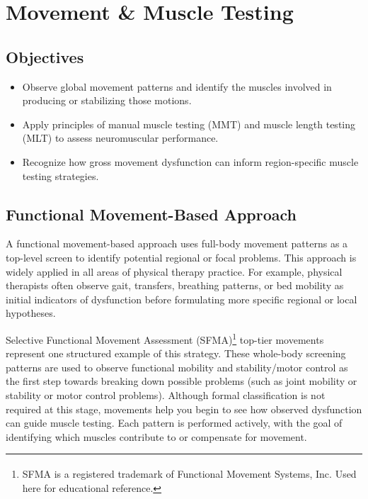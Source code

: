 \chapter{Movement \& Muscle Testing}\label{chp:muscle_testing}

\section*{Objectives}
\begin{itemize}
  \item Observe global movement patterns and identify the muscles involved in producing or stabilizing those motions.
  \item Apply principles of manual muscle testing (MMT) and muscle length testing (MLT) to assess neuromuscular performance.
  \item Recognize how gross movement dysfunction can inform region-specific muscle testing strategies.
\end{itemize}

\section*{Functional Movement-Based Approach}

A functional movement-based approach uses full-body movement patterns as a top-level screen to identify potential regional or focal problems. This approach is widely applied in all areas of physical therapy practice. For example, physical therapists often observe gait, transfers, breathing patterns, or bed mobility as initial indicators of dysfunction before formulating more specific regional or local hypotheses. 

 Selective Functional Movement Assessment (SFMA)\textsuperscript{\textregistered}\footnote{SFMA\textsuperscript{\textregistered} is a registered trademark of Functional Movement Systems, Inc. Used here for educational reference.} top-tier movements represent one structured example of this strategy. These whole-body screening patterns are used to observe functional mobility and stability/motor control as the first step towards breaking down possible problems (such as joint mobility or stability or motor control problems). Although formal classification is not required at this stage, movements help you begin to see how observed dysfunction can guide muscle testing. Each pattern is performed actively, with the goal of identifying which muscles contribute to or compensate for movement.

